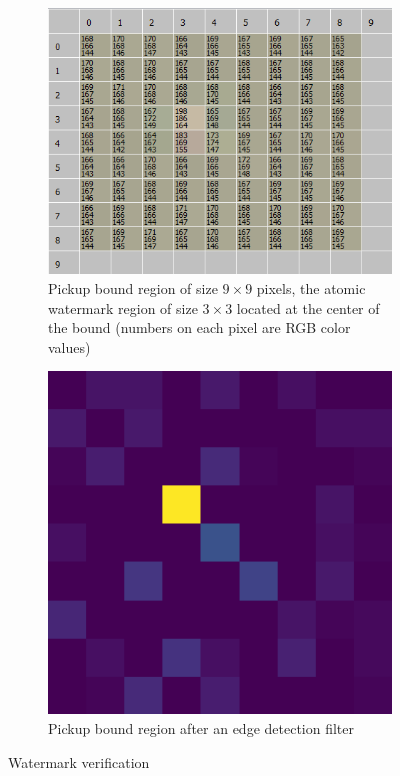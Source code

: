 \documentclass[a4paper,11pt,onecolumn]{memoir}
\begin{document}
\begin{figure}[ht]
    \centering
    \begin{subfigure}[t]{0.45\textwidth}
        \includegraphics[width=\textwidth]{coca_cola_bound.png}
        \caption{Pickup bound region of size $9\times9$ pixels, the atomic watermark region of size $3\times3$ located at the center of the bound (numbers on each pixel are RGB color values)}
        \label{subfig:coca_cola_pickup}
    \end{subfigure}
    \qquad
    \begin{subfigure}[t]{0.45\textwidth}
        \includegraphics[width=\textwidth]{coca_cola_laplace.png}
        \caption{Pickup bound region after an edge detection filter}
        \label{subfig:coca_cola_pickup_filtered}
    \end{subfigure}
    \caption{Watermark verification}
    \label{fig:coca_cola_bound}
\end{figure}
\end{document}
